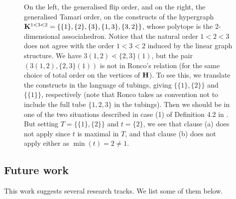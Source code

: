 \documentclass{article}
\theoremstyle{plain}
\theoremstyle{definition}
\newcommand{\set}[1]{\{#1\}}
\newcommand{\hyper}[1]{{\bf #1}}
\begin{document}
\begin{figure}
\begin{center}
{} 
\end{center} 
\caption{On the left, the generalised flip order, and on the right, the generalised Tamari order, on the constructs of the hypergraph $\hyper{K}^{1<3<2}=\set{\set{1},\set{2},\set{3},\set{1,3},\set{3,2}}$, whose polytope is the 2-dimensional associahedron. Notice that the natural order $1<2<3$ does not agree with the order $1<3<2$ induced by the linear graph structure. We have $3(1,2)\lessdot \set{2,3}(1)$, but the pair
$(3(1,2),\set{2,3}(1))$ is not in Ronco's relation (for the same choice of total order on the vertices of $\hyper{H}$). To see this, we translate the constructs in the language of tubings, giving $\set{\set{1},\set{2}}$ and $\set{\set{1}}$, respectively (note that Ronco takes as convention not to include the full tube $\set{1,2,3}$ in the tubings). Then we should be in one of the two situations described in case (1) of Definition 4.2 in \cite{RoncoGTO}. But setting $T=\set{\set{1},\set{2}}$ and $t=\set{2}$, we see that clause (a) does not apply since $t$ is maximal in $T$, and that clause (b) does not apply either as $\min(t)=2\neq 1$.}\label{Rdiff}
\end{figure}
 

 
 

\subsection{Future work}

This work suggests several research tracks. We list some of them below.
\end{document}
